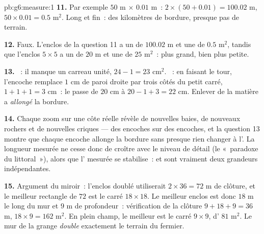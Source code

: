 \begin{solution}{pb:g6:measure:1}
\textbf{11.} Par exemple $50$ m $\times$ $0.01$ m~: 
$2 \times (50 + 0.01) = 100.02$ m,  $50 \times 0.01 = 0.5$
m$^2$. Long et fin~: des kilomètres de bordure, presque pas de
terrain.

\textbf{12.} Faux. L'enclos de la question 11 a un  de
$100.02$ m et une  de $0.5$ m$^2$, tandis que l'enclos
$5 \times 5$ a un  de $20$ m et une  de $25$ m$^2$~:
 plus grand,  bien plus petite.

\textbf{13.} ~: il manque un carreau unité, $24 - 1 = 23$
cm$^2$. ~: en faisant le tour, l'encoche remplace $1$ cm de
paroi droite par trois côtés du petit carré, $1 + 1 + 1 = 3$ cm~: le
 passe de $20$ cm à $20 - 1 + 3 = 22$ cm. Enlever de la
matière a \emph{allongé} la bordure.

\textbf{14.} Chaque zoom sur une côte réelle révèle de nouvelles
baies, de nouveaux rochers et de nouvelles criques --- des encoches
sur des encoches, et la question 13 montre que chaque encoche
allonge la bordure sans presque rien changer à l'. La longueur
mesurée ne cesse donc de croître avec le niveau de détail (le
«~paradoxe du littoral~»), alors que l' mesurée se stabilise~:
 et  sont vraiment deux grandeurs indépendantes.

\textbf{15.} Argument du miroir~: l'enclos doublé utiliserait
$2 \times 36 = 72$ m de clôture, et le meilleur rectangle de
 $72$ est le carré $18 \times 18$. Le meilleur enclos est
donc $18$ m le long du mur et $9$ m de profondeur~: vérification de
la clôture $9 + 18 + 9 = 36$ m,  $18 \times 9 = 162$ m$^2$. En
plein champ, le meilleur est le carré $9 \times 9$, d'
$81$ m$^2$. Le mur de la grange \emph{double} exactement le terrain
du fermier.
\end{solution}
